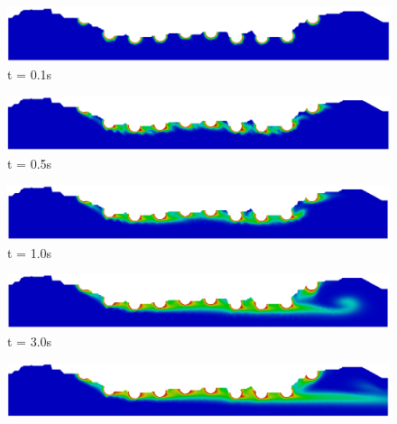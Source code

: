 \begin{figure}[H]
     \begin{minipage}{.50\linewidth}
      \centering
      \includegraphics[scale=0.18]{./02_chaps/cap_solution/figure/conc10_RealStrut1.png}\\
      t = 0.1s
     \end{minipage}%
     \begin{minipage}{.50\linewidth}
      \centering
      \includegraphics[scale=0.18]{./02_chaps/cap_solution/figure/conc10_RealStrut2.png}\\
      t = 0.5s
     \end{minipage}
     \begin{minipage}{.50\linewidth}
     \medskip
      \centering
      \includegraphics[scale=0.18]{./02_chaps/cap_solution/figure/conc10_RealStrut3.png}\\
      t = 1.0s
     \end{minipage}%
     \begin{minipage}{.50\linewidth}
     \medskip
      \centering
      \includegraphics[scale=0.18]{./02_chaps/cap_solution/figure/conc10_RealStrut4.png}\\
      t = 3.0s
     \end{minipage}
     \begin{minipage}{.50\linewidth}
      \centering
      \includegraphics[scale=0.18]{./02_chaps/cap_solution/figure/conc10_RealStrut5.png}\\

\end{minipage}
\end{figure}

